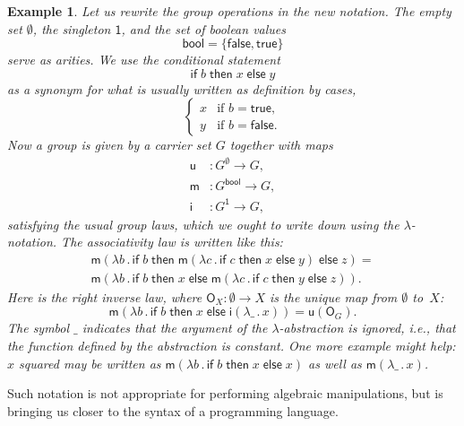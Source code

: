 \documentclass{amsart}
\newcommand{\set}[1]{\{#1\}} %
\newcommand{\lam}[1]{\lambda #1 \,.\,}
\newcommand{\one}{\mathsf{1}} %
\newcommand{\bool}{\mathsf{bool}} %
\newcommand{\true}{\mathsf{true}}
\newcommand{\false}{\mathsf{false}}
\newcommand{\cond}[3]{\mathsf{if}\;#1\;\mathsf{then}\;#2\;\mathsf{else}\;#3}
\newtheorem{example}[definition]{Example}
\begin{document}
\begin{example}
  Let us rewrite the group operations in the new notation. The empty set
  $\emptyset$, the singleton $\one$, and the set of boolean values
  \begin{equation*}
    \bool = \set{\false, \true}
  \end{equation*}
  serve as arities. We use the conditional statement
  \begin{equation*}
    \cond{b}{x}{y}
  \end{equation*}
  as a synonym for what is usually written as definition by cases,
  \begin{equation*}
  \begin{cases}
      x & \text{if $b = \true$,}\\
      y & \text{if $b = \false$.}
    \end{cases}
  \end{equation*}
  Now a group is given by a carrier set $G$ together with maps
  \begin{align*}
    \mathsf{u} &: G^\emptyset \to G,\\
    \mathsf{m} &: G^\bool \to G,\\
    \mathsf{i} &: G^\one \to G,
  \end{align*}
  satisfying the usual group laws, which we ought to write down using the
  $\lambda$-notation. The associativity law is written like this:
  \begin{multline*}
    \mathsf{m}(\lam{b} \cond{b}{\mathsf{m}(\lam{c}\cond{c}{x}{y})}{z}) = \\
    \mathsf{m}(\lam{b} \cond{b}{x}{\mathsf{m}(\lam{c} \cond{c}{y}{z})}).
  \end{multline*}
  Here is the right inverse law, where $\mathsf{O}_X : \emptyset \to X$ is
  the unique map from $\emptyset$ to~$X$:
  \begin{equation*}
    \mathsf{m}(\lam{b} \cond{b}{x}{\mathsf{i}(\lam{\_}{x})}) =
    \mathsf{u}(\mathsf{O}_G).
  \end{equation*}
  The symbol $\_$ indicates that the argument of the $\lambda$-abstraction is
  ignored, i.e., that the function defined by the abstraction is constant. One
  more example might help: $x$ squared may be written as
  $\mathsf{m}(\lam{b} \cond{b}{x}{x})$ as well as $\mathsf{m}(\lam{\_} x)$.
\end{example}

Such notation is not appropriate for performing algebraic manipulations, but is
bringing us closer to the syntax of a programming language.
\end{document}
